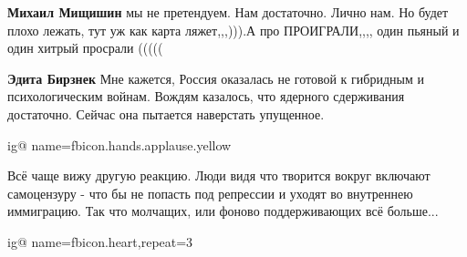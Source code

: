 \begin{itemize}
\begin{itemize}
 
\textbf{Михаил Мищишин} мы не претендуем. Нам достаточно. Лично нам. Но будет
плохо лежать, тут уж как карта ляжет,,,))).А про ПРОИГРАЛИ,,,, один пьяный и
один хитрый просрали (((((

 
\textbf{Эдита Бирзнек} Мне кажется, Россия оказалась не готовой к гибридным и психологическим войнам. Вождям казалось, что ядерного сдерживания достаточно. Сейчас она пытается наверстать упущенное.
\end{itemize}

 
\ifcmt
  ig@ name=fbicon.hands.applause.yellow
\fi

 

Всё чаще вижу другую реакцию. Люди видя что творится вокруг включают
самоцензуру - что бы не попасть под репрессии и уходят во внутреннею иммиграцию.
Так что молчащих, или фоново поддерживающих всё больше...

 

\ifcmt
  ig@ name=fbicon.heart,repeat=3
\fi


 

\end{itemize}
